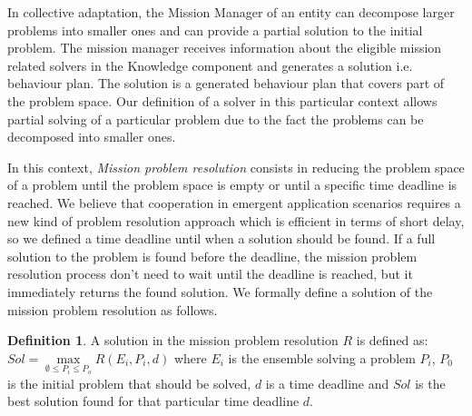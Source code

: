 \documentclass[journal]{IEEEtran}
\theoremstyle{definition}
\newtheorem{definition}{Definition}
\begin{document}
In collective adaptation, the Mission Manager of an entity can decompose larger problems into smaller ones and can provide a partial solution to the initial problem. 
The mission manager receives information about the eligible mission related solvers in the Knowledge component and generates a solution i.e. behaviour plan. The solution is a generated behaviour plan that covers part of the problem space.
Our definition of a solver in this particular context allows partial solving of a particular problem due to the fact the problems can be decomposed into smaller ones. 


In this context, \textit{Mission problem resolution} consists in reducing the problem space of a problem until the problem space is empty or until a specific time deadline is reached. We believe that cooperation in emergent application scenarios requires a new kind of problem resolution approach which is efficient in terms of short delay, so we defined a time deadline until when a solution should be found. If a full solution to the problem is found before the deadline, the mission problem resolution process don't need to wait until the deadline is reached, but it immediately returns the found solution.
We formally define a solution of the mission problem resolution as follows.

\begin{definition}
A solution in the mission problem resolution $R$ is defined as:
$Sol=\max \limits_{ \emptyset \leq P_i \leq P_o} R(E_i, P_i, d)$
where $E_i$ is the ensemble solving a problem $P_i$, $P_0$ is the initial problem that should be solved, $d$ is a time deadline and $Sol$ is the best solution found for that particular time deadline $d$.





\end{definition}
\end{document}
